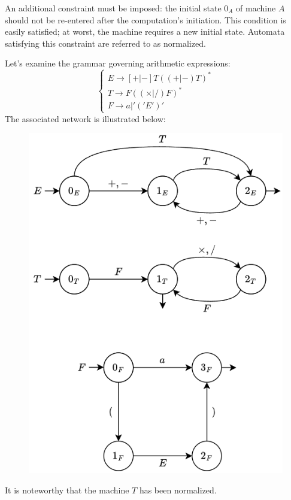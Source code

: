 An additional constraint must be imposed: the initial state $0_A$ of machine $A$ should not be re-entered after the computation's initiation.
This condition is easily satisfied; at worst, the machine requires a new initial state.
Automata satisfying this constraint are referred to as normalized.
\begin{example}
    Let's examine the grammar governing arithmetic expressions:
    \[\begin{cases}
        E \rightarrow [+|-]T((+|-)T)^{*} \\
        T \rightarrow F((\times|/)F)^{*} \\
        F \rightarrow a | '('E')'
    \end{cases}\]   
    The associated network is illustrated below:
    \begin{figure}[H]
        \centering
        \includegraphics[width=0.4\linewidth]{images/net.png}
    \end{figure}
    It is noteworthy that the machine $T$ has been normalized.
\end{example}

